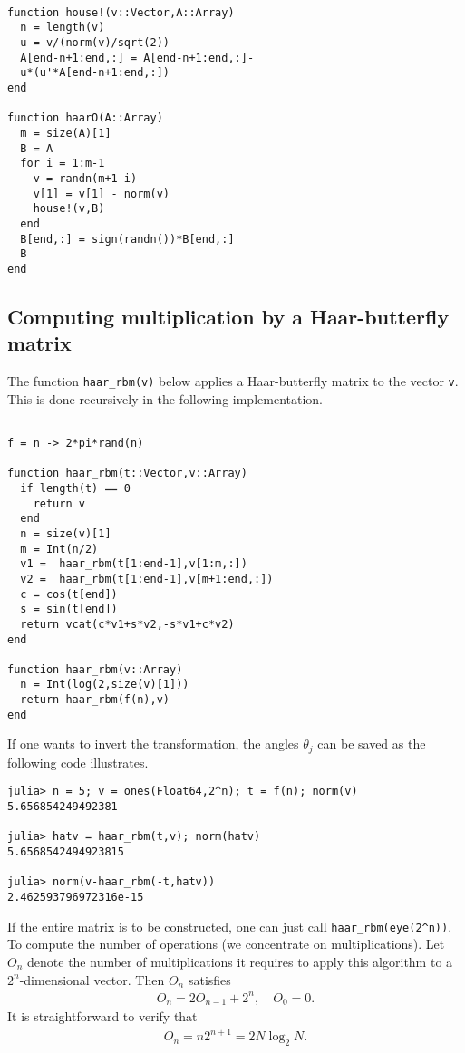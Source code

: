\documentclass{amsart}
\theoremstyle{definition}
\theoremstyle{remark}
\numberwithin{equation}{section}
\begin{document}
\begin{lstlisting}[linewidth = \linewidth,frame = trBL]%
  
function house!(v::Vector,A::Array)
  n = length(v)
  u = v/(norm(v)/sqrt(2))
  A[end-n+1:end,:] = A[end-n+1:end,:]-
  u*(u'*A[end-n+1:end,:])
end

function haarO(A::Array)
  m = size(A)[1]
  B = A
  for i = 1:m-1
    v = randn(m+1-i)
    v[1] = v[1] - norm(v)
    house!(v,B)
  end
  B[end,:] = sign(randn())*B[end,:]  
  B
end
\end{lstlisting}


\subsection{Computing multiplication by a Haar-butterfly  matrix}\label{s:code_haarrbm}

The function {\tt haar\_rbm(v)} below applies a Haar-butterfly matrix to the vector {\tt v}.  This is done recursively in the following implementation.

\begin{lstlisting}[linewidth = \linewidth,frame = trBL]%[float,caption=A floating example]
  
f = n -> 2*pi*rand(n)

function haar_rbm(t::Vector,v::Array)
  if length(t) == 0
    return v
  end
  n = size(v)[1]
  m = Int(n/2)
  v1 =  haar_rbm(t[1:end-1],v[1:m,:])
  v2 =  haar_rbm(t[1:end-1],v[m+1:end,:])
  c = cos(t[end])
  s = sin(t[end])
  return vcat(c*v1+s*v2,-s*v1+c*v2)
end

function haar_rbm(v::Array)
  n = Int(log(2,size(v)[1]))
  return haar_rbm(f(n),v)
end

\end{lstlisting}

If one wants to invert the transformation, the angles $\theta_j$ can be saved as the following code illustrates.

\begin{lstlisting}[linewidth = \linewidth,frame = trBL]
julia> n = 5; v = ones(Float64,2^n); t = f(n); norm(v)
5.656854249492381

julia> hatv = haar_rbm(t,v); norm(hatv)
5.6568542494923815 

julia> norm(v-haar_rbm(-t,hatv))
2.462593796972316e-15 
\end{lstlisting}

If the entire matrix is to be constructed, one can just call {\tt haar\_rbm(eye(2\string^n))}. To compute the number of operations (we concentrate on multiplications). Let $O_n$ denote the number of multiplications it requires to apply this algorithm to a $2^n$-dimensional vector.  Then $O_n$ satisfies
\begin{align}
  O_n = 2 O_{n-1} + 2^{n}, \quad O_0 = 0.
\end{align}
It is straightforward to verify that
\begin{align}\label{e:iter-haar}
  O_n = n 2^{n+1} = 2N \log_2 N.
\end{align}
\end{document}
